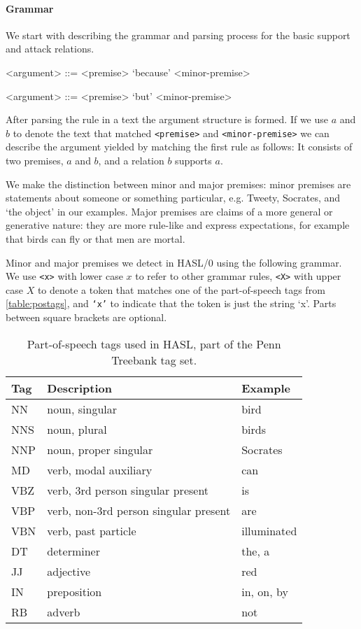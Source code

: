 \paragraph{Grammar} We start with describing the grammar and parsing process for the basic support and attack relations.

\begin{grammar}
<argument> ::= <premise> `because' <minor-premise> %

<argument> ::= <premise> `but' <minor-premise> %
\end{grammar}

\noindent After parsing the rule in a text the argument structure is formed. If we use $a$ and $b$ to denote the text that matched \texttt{<premise>} and \texttt{<minor-premise>} we can describe the argument yielded by matching the first rule as follows: It consists of two premises, $a$ and $b$, and a relation $b$ supports $a$.

We make the distinction between minor and major premises: minor premises are statements about someone or something particular, e.g. Tweety, Socrates, and `the object' in our examples. Major premises are claims of a more general or generative nature: they are more rule-like and express expectations, for example that birds can fly or that men are mortal.

Minor and major premises we detect in HASL/0 using the following grammar. We use \texttt{<x>} with lower case $x$ to refer to other grammar rules, \texttt{<X>} with upper case $X$ to denote a token that matches one of the part-of-speech tags from \autoref{table:postags}, and \texttt{`x'} to indicate that the token is just the string `x'. Parts between square brackets are optional.

\begin{table}
    \begin{tabular}{lll}
        Tag & Description & Example \\
        \hline
        NN  & noun, singular & bird \\
        NNS & noun, plural & birds \\
        NNP & noun, proper singular & Socrates \\
        MD  & verb, modal auxiliary & can \\
        VBZ & verb, 3rd person singular present & is \\
        VBP & verb, non-3rd person singular present & are \\
        VBN & verb, past particle & illuminated \\
        DT  & determiner & the, a \\
        JJ  & adjective & red \\
        IN  & preposition & in, on, by \\
        RB  & adverb & not
    \end{tabular}
    \caption{Part-of-speech tags used in HASL, part of the Penn Treebank tag set.}
    \label{table:postags}
\end{table}

